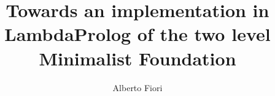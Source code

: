 \usepackage{ebproof}%

\author{Alberto Fiori}
\title{Towards an implementation in LambdaProlog of the two level Minimalist Foundation}






\newcommand{\noop}[1]{}
\newcommand{\s}[1]{\noop\textsf{\text{\ensuremath{\mathsf{#1}}}}}
\newcommand{\type}{\s{type}}





